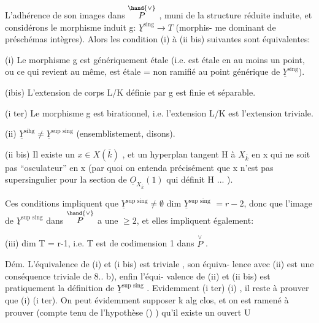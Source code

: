 
L'adhérence de son images dans $\overset{\hand{\vee}}{P}$ , muni de la structure réduite
induite, et considérons le morphisme induit g: $\underline{Y}^{\text{sing}} \longrightarrow T$  (morphis-%
me dominant de préschémas  intègres). Alors les condition
(i) à (ii bis) suivantes sont équivalentes:

(i) Le morphisme g est génériquement  étale (i.e. est  étale en au moins un point, ou ce qui revient au même, est étale = non ramifié
au point générique de $\underline{Y}^{\text{sing}}$).

(ibis) L'extension de corps L/K définie par g est finie et
séparable.

(i ter) Le morphisme g est birationnel, i.e. l'extension L/K est
l'extension triviale.

(ii) $\underline{Y}^{\text{sihg}} \neq \underline{Y}^{\text{sup sing}}$ (ensemblistement, disons).

(ii bis) Il existe un $x \in X(\bar{k})$ , et un hyperplan tangent H à $X_{\bar{k}}$
en x qui ne soit pas ``osculateur'' en x (par quoi on entenda précisément
que x n'est pas supersingulier pour la section de $\underline{O}_{X_{\bar{k}}}(1)$ qui définit
H ... ).

Ces conditions impliquent que $\underline{Y}^{\text{sup sing}} \neq \emptyset$  dim $\underline{Y}^{\text{sup sing}}$ $= r-2$, donc que
l'image de $\underline{Y}^{\text{sup sing}}$ dans $\overset{\hand{\vee}}{P}$ a une  $\geqslant 2$, et  elles impliquent
également:

(iii) dim T = r-1, i.e. T est de codimension 1 dans $\overset{\vee}{P}$ .

Dém. L'équivalence de (i) et (i bis) est triviale , son équiva-%
lence avec (ii) est une conséquence triviale de 8.. b), enfin l'équi-%
valence de (ii) et (ii bis) est pratiquement la définition de
$\underline{Y}^{\text{sup sing}}$ . Evidemment (i ter) \hand{$\Longrightarrow$}(i) , il reste à prouver que (i)\hand{$\Longrightarrow$}
(i ter). On peut évidemment supposer k alg clos, et on est ramené à
prouver (compte tenu de l'hypothèse () ) qu'il existe un ouvert U\hand{$\neq\emptyset$}

